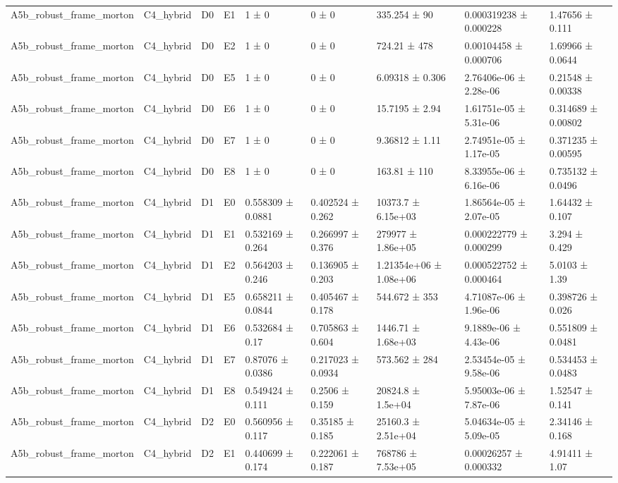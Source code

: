\begin{table}
\begin{tabular}{lllllllll}
A5b\_robust\_frame\_morton & C4\_hybrid & D0 & E1 & 1 ± 0 & 0 ± 0 & 335.254 ± 90 & 0.000319238 ± 0.000228 & 1.47656 ± 0.111 \\
A5b\_robust\_frame\_morton & C4\_hybrid & D0 & E2 & 1 ± 0 & 0 ± 0 & 724.21 ± 478 & 0.00104458 ± 0.000706 & 1.69966 ± 0.0644 \\
A5b\_robust\_frame\_morton & C4\_hybrid & D0 & E5 & 1 ± 0 & 0 ± 0 & 6.09318 ± 0.306 & 2.76406e-06 ± 2.28e-06 & 0.21548 ± 0.00338 \\
A5b\_robust\_frame\_morton & C4\_hybrid & D0 & E6 & 1 ± 0 & 0 ± 0 & 15.7195 ± 2.94 & 1.61751e-05 ± 5.31e-06 & 0.314689 ± 0.00802 \\
A5b\_robust\_frame\_morton & C4\_hybrid & D0 & E7 & 1 ± 0 & 0 ± 0 & 9.36812 ± 1.11 & 2.74951e-05 ± 1.17e-05 & 0.371235 ± 0.00595 \\
A5b\_robust\_frame\_morton & C4\_hybrid & D0 & E8 & 1 ± 0 & 0 ± 0 & 163.81 ± 110 & 8.33955e-06 ± 6.16e-06 & 0.735132 ± 0.0496 \\
A5b\_robust\_frame\_morton & C4\_hybrid & D1 & E0 & 0.558309 ± 0.0881 & 0.402524 ± 0.262 & 10373.7 ± 6.15e+03 & 1.86564e-05 ± 2.07e-05 & 1.64432 ± 0.107 \\
A5b\_robust\_frame\_morton & C4\_hybrid & D1 & E1 & 0.532169 ± 0.264 & 0.266997 ± 0.376 & 279977 ± 1.86e+05 & 0.000222779 ± 0.000299 & 3.294 ± 0.429 \\
A5b\_robust\_frame\_morton & C4\_hybrid & D1 & E2 & 0.564203 ± 0.246 & 0.136905 ± 0.203 & 1.21354e+06 ± 1.08e+06 & 0.000522752 ± 0.000464 & 5.0103 ± 1.39 \\
A5b\_robust\_frame\_morton & C4\_hybrid & D1 & E5 & 0.658211 ± 0.0844 & 0.405467 ± 0.178 & 544.672 ± 353 & 4.71087e-06 ± 1.96e-06 & 0.398726 ± 0.026 \\
A5b\_robust\_frame\_morton & C4\_hybrid & D1 & E6 & 0.532684 ± 0.17 & 0.705863 ± 0.604 & 1446.71 ± 1.68e+03 & 9.1889e-06 ± 4.43e-06 & 0.551809 ± 0.0481 \\
A5b\_robust\_frame\_morton & C4\_hybrid & D1 & E7 & 0.87076 ± 0.0386 & 0.217023 ± 0.0934 & 573.562 ± 284 & 2.53454e-05 ± 9.58e-06 & 0.534453 ± 0.0483 \\
A5b\_robust\_frame\_morton & C4\_hybrid & D1 & E8 & 0.549424 ± 0.111 & 0.2506 ± 0.159 & 20824.8 ± 1.5e+04 & 5.95003e-06 ± 7.87e-06 & 1.52547 ± 0.141 \\
A5b\_robust\_frame\_morton & C4\_hybrid & D2 & E0 & 0.560956 ± 0.117 & 0.35185 ± 0.185 & 25160.3 ± 2.51e+04 & 5.04634e-05 ± 5.09e-05 & 2.34146 ± 0.168 \\
A5b\_robust\_frame\_morton & C4\_hybrid & D2 & E1 & 0.440699 ± 0.174 & 0.222061 ± 0.187 & 768786 ± 7.53e+05 & 0.00026257 ± 0.000332 & 4.91411 ± 1.07 \\

\end{tabular}
\end{table}
